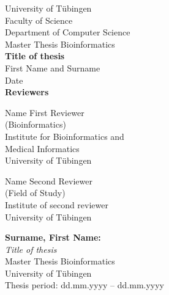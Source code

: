 \documentclass[twoside,12pt,a4paper]{report}
\begin{document}
 
\begin{titlepage}
 \begin{center}
  {\LARGE University of T\"ubingen}\\
  {\large Faculty of Science \\
 Department of Computer Science\\[4cm]}
  {\huge Master Thesis Bioinformatics\\[2cm]}
  {\Large\bf Title of thesis\\[1.5cm]}
 {\large First Name and Surname}\\[0.5cm]
  Date\\[3cm]
{\small\bf Reviewers}\\[0.5cm]
  \parbox{7cm}{\begin{center}{\large Name First Reviewer}\\
   (Bioinformatics)\\
  {\footnotesize Institute for Bioinformatics and\\ Medical Informatics\\
	University of T\"ubingen}\end{center}}\hfill\parbox{7cm}{\begin{center}
  {\large Name Second Reviewer}\\
  (Field of Study)\\
  {\footnotesize Institute of second reviewer\\
	University of T\"ubingen}\end{center}
 }
  \end{center}
\end{titlepage}


\thispagestyle{empty}
\vspace*{\fill}
\begin{minipage}{11.2cm}
\textbf{Surname, First Name:}\\
\emph{Title of thesis}\\ Master Thesis Bioinformatics\\
University of T\"ubingen\\
Thesis period: dd.mm.yyyy -- dd.mm.yyyy
\end{minipage}
\newpage
\end{document}
